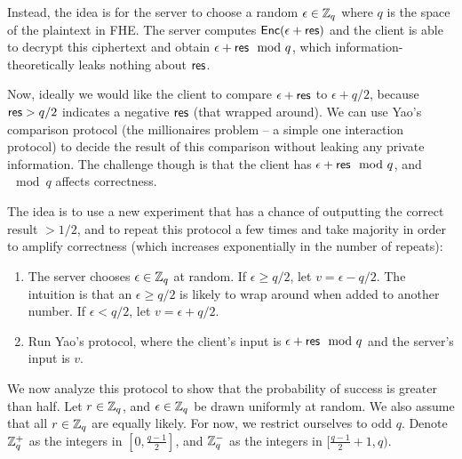\documentclass[11pt]{article}
\begin{document}
Instead, the idea is for the server to choose a random $\epsilon \in {\mathbb Z}_q$ where $q$ is the space of the plaintext in FHE. The server computes $\mathsf{Enc}(\epsilon + \mathsf{res})$ and the client is able to decrypt this ciphertext and obtain $\epsilon + \mathsf{res} \mod q$, which information-theoretically leaks nothing about $\mathsf{res}$.

Now, ideally we would like the client to compare $\epsilon + \mathsf{res}$ to $\epsilon + q/2$, because $\mathsf{res} > q/2$ indicates a negative $\mathsf{res}$ (that wrapped around). We can use Yao's comparison protocol (the millionaires problem -- a simple one interaction protocol) to decide the result of this comparison without leaking any private information. The challenge though is that the client has $\epsilon + \mathsf{res} \mod q$, and $\mod q$ affects correctness.

The idea is to use a new experiment that has a chance of outputting the correct result $>1/2$, and to repeat this protocol a few times and take majority in order to amplify correctness (which increases exponentially in the number of repeats):

\newcommand{\eps}{\epsilon}

\begin{enumerate}
\item
    The server chooses $\epsilon \in {\mathbb Z}_q$ at random. If $\epsilon \geq q/2$,
    let $v = \eps - q/2$. The intuition is that an $\eps \geq q/2$ is likely to
    wrap around when added to another number. If $\eps < q/2$, let $v = \eps +
    q/2$.
\item Run Yao's protocol, where the client's input is $\eps + \res \mod q$ and the server's input is $v$.
\end{enumerate}

We now analyze this protocol to show that the probability of success is greater
than half. Let $r \in {\mathbb Z}_q$, and $\epsilon \in {\mathbb Z}_q$ be drawn uniformly at
random. We also assume that all $r \in {\mathbb Z}_q$ are equally likely. For now, we
restrict ourselves to odd $q$. Denote ${\mathbb Z}_q^+$ as the integers in $[0,
\frac{q-1}{2}]$, and ${\mathbb Z}_q^-$ as the integers in $[\frac{q-1}{2}+1, q)$.
\end{document}
